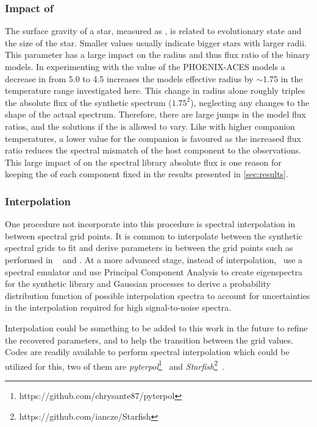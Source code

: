 \subsubsection{Impact of \Logg{}}
\label{subsubsec:logg} 
The surface gravity of a star, measured as \Logg{}, is related to evolutionary state and the size of the star.
Smaller \Logg{} values usually indicate bigger stars with larger radii.
This parameter has a large impact on the radius and thus flux ratio of the binary models.
In experimenting with the \Logg{} value of the {PHOENIX-ACES} models a decrease in \Logg{} from 5.0 to 4.5 increases the models effective radius by \(\sim\)1.75 in the temperature range investigated here.
This change in radius alone roughly triples the absolute flux of the synthetic spectrum (\(1.75^2\)), neglecting any changes to the shape of the actual spectrum.
Therefore, there are large jumps in the model flux ratios, and the \textchisquared{} solutions if the \Logg{} is allowed to vary.
Like with higher companion temperatures, a lower \Logg{} value for the companion is favoured as the increased flux ratio reduces the spectral mismatch of the host component to the observations.
This large impact of \Logg{} on the spectral library absolute flux is one reason for keeping the \Logg{} of each component fixed in the \textchisquared{} results presented in \cref{sec:results}.

\subsubsection{Interpolation}
\label{subsubsec:interpolation}
One procedure not incorporate into this \textchisquared{} procedure is spectral interpolation in between spectral grid points.
It is common to interpolate between the synthetic spectral grids to fit and derive parameters in between the grid points such as performed in ~\citet{nemravova_xtauri_2016} and \citet{passegger_fundamental_2016}.
At a more advanced stage, instead of interpolation,~\cite{czekala_constructing_2015} use a spectral emulator and use Principal Component Analysis to create eigenspectra for the synthetic library and Gaussian processes to derive a probability distribution function of possible interpolation spectra to account for uncertainties in the interpolation required for high signal-to-noise spectra.

Interpolation could be something to be added to this work in the future to refine the recovered parameters, and to help the transition between the grid \Logg{} values.
Codes are readily available to perform spectral interpolation which could be utilized for this, two of them are \emph{pyterpol}\footnote{https://github.com/chrysante87/pyterpol}~\citet{nemravova_xtauri_2016} and \emph{Starfish}\footnote{https://github.com/iancze/Starfish}~\cite{czekala_constructing_2015}.


